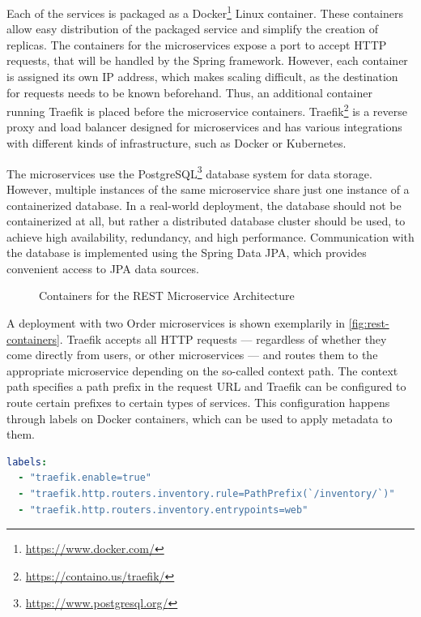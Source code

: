 Each of the services is packaged as a Docker\footnote{\url{https://www.docker.com/}} Linux container.
These containers allow easy distribution of the packaged service and simplify the creation of replicas.
The containers for the microservices expose a port to accept \ac{HTTP} requests, that will be handled by the Spring framework.
However, each container is assigned its own \acs{IP} address, which makes scaling difficult, as the destination for requests needs to be known beforehand.
Thus, an additional container running Traefik is placed before the microservice containers.
Traefik\footnote{\url{https://containo.us/traefik/}} is a reverse proxy and load balancer designed for microservices and has various integrations with different kinds of infrastructure, such as Docker or Kubernetes.

The microservices use the PostgreSQL\footnote{\url{https://www.postgresql.org/}} database system for data storage.
However, multiple instances of the same microservice share just one instance of a containerized database.
In a real-world deployment, the database should not be containerized at all, but rather a distributed database cluster should be used, to achieve high availability, redundancy, and high performance.
Communication with the database is implemented using the Spring Data \acs{JPA}, which provides convenient access to \ac{JPA} data sources.

\begin{figure}[!htb]
    \centering
    
    \caption{Containers for the \acs{REST} Microservice Architecture}\label{fig:rest-containers}
\end{figure}

A deployment with two Order microservices is shown exemplarily in \autoref{fig:rest-containers}.
Traefik accepts all \ac{HTTP} requests --- regardless of whether they come directly from users, or other microservices --- and routes them to the appropriate microservice depending on the so-called context path.
The context path specifies a path prefix in the request \ac{URL} and Traefik can be configured to route certain prefixes to certain types of services.
This configuration happens through labels on Docker containers, which can be used to apply metadata to them.


\begin{lstlisting}[caption={Traefik Configuration for the Inventory Service}, showlines=true, label=lst:traefik-docker, language=yaml]
labels:
  - "traefik.enable=true"
  - "traefik.http.routers.inventory.rule=PathPrefix(`/inventory/`)"
  - "traefik.http.routers.inventory.entrypoints=web"
\end{lstlisting}


